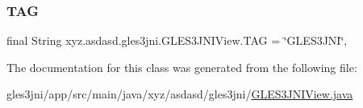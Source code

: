 \mbox{\label{classxyz_1_1asdasd_1_1gles3jni_1_1_g_l_e_s3_j_n_i_view_ac2d92c5f042ecccc1a703a09b99662d0}} 
\subsubsection{\texorpdfstring{T\+AG}{TAG}}
{\footnotesize\ttfamily final String xyz.\+asdasd.\+gles3jni.\+G\+L\+E\+S3\+J\+N\+I\+View.\+T\+AG = \char`\"{}G\+L\+E\+S3\+J\+NI\char`\"{}\hspace{0.3cm}{\ttfamily [static]}, {\ttfamily [private]}}



The documentation for this class was generated from the following file\+:\begin{DoxyCompactItemize}
\item 
gles3jni/app/src/main/java/xyz/asdasd/gles3jni/\hyperlink{_g_l_e_s3_j_n_i_view_8java}{G\+L\+E\+S3\+J\+N\+I\+View.\+java}\end{DoxyCompactItemize}
